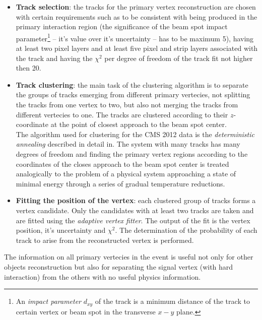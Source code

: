 \begin{itemize}

 \item \textbf{Track selection}: the tracks for the primary vertex reconstruction are chosen with certain requirements such as to be consistent with being produced 
 in the primary interaction region (the significance of the beam spot impact parameter\footnote{An \textit{impact parameter} $d_{xy}$ of the track is a minimum
 distance of the track to certain vertex or beam spot in the transverse $x-y$ plane.} -- it's value over it's uncertainty -- has to be maximum 5), having at least two pixel 
 layers and at least five pixel and strip layers associated with the track and having the $\chi^{2}$ per degree of freedom of the track fit not higher then 20.
 \item \textbf{Track clustering}: the main task of the clustering algorithm is to separate the groups of tracks emerging from different primary vertecies, not splitting 
 the tracks from one vertex to two, but also not merging the tracks from different vertecies to one. The tracks are clustered according 
 to their $z$-coordinate at the point of closest approach to the beam spot center. 
 \\
 The algorithm used for clustering for the CMS 2012 data is the \textit{deterministic annealing} described in detail in\cite{rose_ieee1998}. The system with many tracks has many degrees
 of freedom and finding the primary vertex regions according to the coordinates of the closes approach to the beam spot center is treated analogically to the problem of a physical 
 system approaching a state of minimal energy through a series of gradual temperature reductions.
 \item \textbf{Fitting the position of the vertex}: each clustered group of tracks forms a vertex candidate. Only the candidates with at least two tracks are taken and are fitted
 using the \textit{adaptive vertex fitter}\cite{Frühwirth:1027031}. The output of the fit is the vertex position, it's uncertainty and $\chi^{2}$. The determination of the probability
 of each track to arise from the reconstructed vertex is performed.
\end{itemize}

The information on all primary vertecies in the event is useful not only for other objects reconstruction but also for separating the signal vertex (with hard interaction) 
from the others with no useful physics information.


